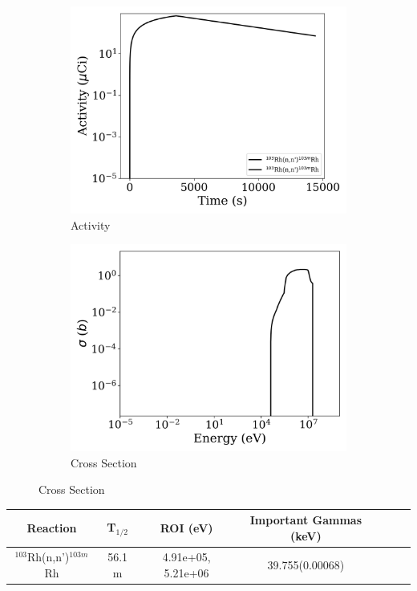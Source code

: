 \begin{figure}[h]
\centering
\begin{subfigure}{.5\textwidth}
  \centering
     \includegraphics[width=.8\textwidth]{plot/Rh-103(n,n')Rh-103m_wisconsin1} 

  \caption{Activity}
\end{subfigure}%
\begin{subfigure}{.5\textwidth}
  \centering
     \includegraphics[width=.8\textwidth]{plot/Rh-103(n,n')Rh-103m} 

  \caption{Cross Section}
\end{subfigure}
\end{figure}

\begin{table}[h]
\centering
\begin{tabular}{ |c|c|c|c|c|c|c| }
 \hline
 Reaction & T$_{1/2}$ & ROI (eV) & Important Gammas (keV) \\
 \hline 
 $^{103}$Rh(n,n')$^{103m}$Rh & 56.1 m & 4.91e+05, 5.21e+06 & 39.755(0.00068) \\ 
\hline
\end{tabular}
\end{table}
